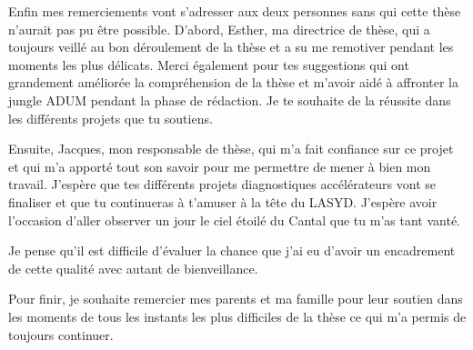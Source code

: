 Enfin mes remerciements vont s'adresser aux deux personnes sans qui cette thèse n'aurait pas pu être possible. D'abord, Esther, ma directrice de thèse, qui a toujours veillé au bon déroulement de la thèse et a su me remotiver pendant les moments les plus délicats. Merci également pour tes suggestions qui ont grandement améliorée la compréhension de la thèse et m'avoir aidé à affronter la jungle ADUM pendant la phase de rédaction. Je te souhaite de la réussite dans les différents projets que tu soutiens.

Ensuite, Jacques, mon responsable de thèse, qui m’a fait confiance sur ce projet et qui m’a apporté tout son savoir pour me permettre de mener à bien mon travail. J’espère que tes différents projets diagnostiques accélérateurs vont se finaliser et que tu continueras à t’amuser à la tête du LASYD. J’espère avoir l’occasion d’aller observer un jour le ciel étoilé du Cantal que tu m’as tant vanté. 

Je pense qu’il est difficile d’évaluer la chance que j’ai eu d’avoir un encadrement de cette qualité avec autant de bienveillance. 

Pour finir, je souhaite remercier mes parents et ma famille pour leur soutien dans les moments de tous les instants les plus difficiles de la thèse ce qui m’a permis de toujours continuer.